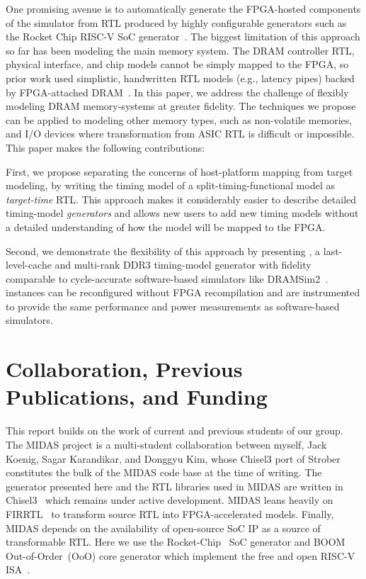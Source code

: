 One promising avenue is to automatically generate the FPGA-hosted
components of the simulator from RTL produced by highly configurable
generators such as the Rocket Chip RISC-V SoC generator~\cite{rocketchip}. The
biggest limitation of this approach so far has been modeling the main
memory system.  The DRAM controller RTL, physical interface, and
chip models cannot be simply mapped to the FPGA, so
prior work used simplistic, handwritten RTL models (e.g.,
latency pipes) backed by FPGA-attached DRAM~\cite{khanms}.
In this paper, we address the challenge of flexibly modeling DRAM
memory-systems at greater fidelity.  The techniques we propose can be
applied to modeling other memory types, such as
non-volatile memories, and I/O devices where transformation from ASIC
RTL is difficult or impossible.  This paper makes the following
contributions:

First, we propose separating the concerns of host-platform mapping
from target modeling, by writing the timing model of a
split-timing-functional model as \emph{target-time} RTL.  This
approach makes it considerably easier to describe detailed
timing-model \emph{generators} and allows new users to add new timing
models without a detailed understanding of how the model will be
mapped to the FPGA.

Second, we demonstrate the flexibility of this approach by presenting \PNAME, a
last-level-cache and multi-rank DDR3 timing-model generator with fidelity comparable to
cycle-accurate software-based simulators like DRAMSim2~\cite{dramsim}. \PNAME
instances can be reconfigured without FPGA recompilation and are instrumented
to provide the same performance and power measurements as software-based
simulators.


\section{Collaboration, Previous Publications, and Funding}

This report builds on the work of current and previous students of our group.
The MIDAS project is a multi-student collaboration between myself, Jack Koenig,
Sagar Karandikar, and Donggyu Kim, whose Chisel3 port of Strober~\cite{strober}
constitutes the bulk of the MIDAS code base at the time of writing. The
generator presented here and the RTL libraries used in MIDAS are written in
Chisel3~\cite{chisel} which remains under active development. MIDAS leans
heavily on FIRRTL~\cite{firrtl} to transform source RTL into FPGA-accelerated
models.  Finally, MIDAS depends on the availability of open-source SoC IP as a
source of transformable RTL. Here we use the Rocket-Chip~\cite{rocketchip} SoC
generator and BOOM~\cite{boom} Out-of-Order~(OoO) core generator which
implement the free and open RISC-V ISA~\cite{riscv}.

